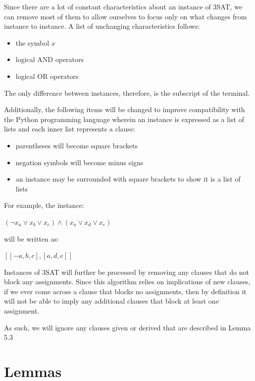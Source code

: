 \documentclass[manuscript]{acmart}
\begin{document}
    Since there are a lot of constant characteristics about an instance of 3SAT, 
    we can remove most of them to allow ourselves to focus only on what changes
    from instance to instance. A list of unchanging characteristics follows:
    \begin{itemize}
        \item the symbol $x$
        \item logical AND operators
        \item logical OR operators
    \end{itemize}
    
    The only difference between instances, therefore, is the subscript of the terminal.
    
    Additionally, the following items will be changed to improve compatibility
    with the Python programming language wherein an instance is expressed as
    a list of lists and each inner list represents a clause:
    \begin{itemize}
        \item parentheses will become square brackets
        \item negation symbols will become minus signs
        \item an instance may be surrounded with square brackets to show it is a list of lists
    \end{itemize}
   
    For example, the instance:
    
    $(\neg x_a \lor x_b \lor x_c) \land (x_a \lor x_d \lor x_e)$

    will be written as:

    $[[-a, b, c], [a, d, e]]$

    Instances of 3SAT will further be processed by removing any clauses that do not block
    any assignments. Since this algorithm relies on implications of new clauses, if we ever
    come across a clause that blocks no assignments, then by definition it will not be able
    to imply any additional clauses that block at least one assignment.

    As such, we will ignore any clauses given or derived that are described in Lemma 5.3

    \section{Lemmas}
\end{document}
